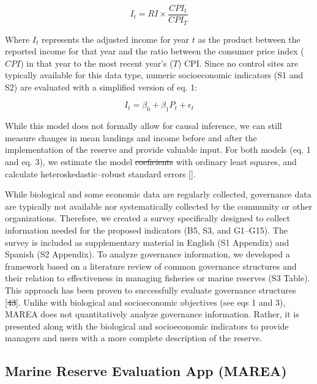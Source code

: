 \documentclass[12pt,]{article}
\providecommand{\DIFaddtex}[1]{{\protect\color{blue}\uwave{#1}}} %
\providecommand{\DIFdeltex}[1]{{\protect\color{red}\sout{#1}}}                      %
\providecommand{\DIFaddbegin}{} %
\providecommand{\DIFaddend}{} %
\providecommand{\DIFdelbegin}{} %
\providecommand{\DIFdelend}{} %
\providecommand{\DIFadd}[1]{\texorpdfstring{\DIFaddtex{#1}}{#1}} %
\providecommand{\DIFdel}[1]{\texorpdfstring{\DIFdeltex{#1}}{}} %
\newcommand{\DIFscaledelfig}{0.5}
\newlength{\DIFdelgraphicswidth} %
\newlength{\DIFdelgraphicsheight} %
\newcommand{\DIFaddincludegraphics}[2][]{{\color{blue}\fbox{\DIFOincludegraphics[#1]{#2}}}} %
\newcommand{\DIFdelincludegraphics}[2][]{%
\sbox{\DIFdelgraphicsbox}{\DIFOincludegraphics[#1]{#2}}%
\settoboxwidth{\DIFdelgraphicswidth}{\DIFdelgraphicsbox} %
\settoboxtotalheight{\DIFdelgraphicsheight}{\DIFdelgraphicsbox} %
\scalebox{\DIFscaledelfig}{%
\parbox[b]{\DIFdelgraphicswidth}{\usebox{\DIFdelgraphicsbox}\\[-\baselineskip] \rule{\DIFdelgraphicswidth}{0em}}\llap{\resizebox{\DIFdelgraphicswidth}{\DIFdelgraphicsheight}{%
\setlength{\unitlength}{\DIFdelgraphicswidth}%
\begin{picture}(1,1)%
\thicklines\linethickness{2pt} %
{\color[rgb]{1,0,0}\put(0,0){\framebox(1,1){}}}%
{\color[rgb]{1,0,0}\put(0,0){\line( 1,1){1}}}%
{\color[rgb]{1,0,0}\put(0,1){\line(1,-1){1}}}%
\end{picture}%
}\hspace*{3pt}}} %
} %
\DeclareRobustCommand{\DIFaddbegin}{\DIFOaddbegin \let\includegraphics\DIFaddincludegraphics} %
\DeclareRobustCommand{\DIFaddend}{\DIFOaddend \let\includegraphics\DIFOincludegraphics} %
\DeclareRobustCommand{\DIFdelbegin}{\DIFOdelbegin \let\includegraphics\DIFdelincludegraphics} %
\DeclareRobustCommand{\DIFdelend}{\DIFOaddend \let\includegraphics\DIFOincludegraphics} %
\begin{document}
\begin{equation}I_t = RI\times \frac{CPI_t}{CPI_T}\end{equation}

Where \(I_t\) represents the adjusted income for year \(t\) as the
product between the reported income for that year and the ratio between
the consumer price index (\(CPI\)) in that year to the most recent
year's (\(T\)) CPI. Since no control sites are typically available for
this data type, numeric socioeconomic indicators (S1 and S2) are
evaluated with a simplified version of eq. 1:

\begin{equation}I_{t}=\beta_0 + \beta_1P_{t} + \epsilon_{t}\end{equation}

While this model does not formally allow for causal inference, we can
still measure changes in mean landings and income before and after the
implementation of the reserve and provide valuable input. For both
models (eq. 1 and eq. 3), we estimate the model \DIFdelbegin \DIFdel{coeficients }\DIFdelend \DIFaddbegin \DIFadd{coefficients }\DIFaddend with
ordinary least squares, and calculate heteroskedastic--robust standard
errors \DIFaddbegin {[}\DIFadd{49}{]}\DIFaddend .

While biological and some economic data are regularly collected,
governance data are typically not available nor systematically collected
by the community or other organizations. Therefore, we created a survey
specifically designed to collect information needed for the proposed
indicators (B5, S3, and G1--G15). The survey is included as
supplementary material in English (S1 Appendix) and Spanish (S2
Appendix). To analyze governance information, we developed a framework
based on a literature review of common governance structures and their
relation to effectiveness in managing fisheries or marine reserves (S3
Table). This approach has been proven to successfully evaluate
governance structures {[}\DIFdelbegin \DIFdel{43}\DIFdelend \DIFaddbegin \DIFadd{50}\DIFaddend {]}. Unlike with biological and socioeconomic
objectives (see eqs 1 and 3), MAREA does not quantitatively analyze
governance information. Rather, it is presented along with the
biological and socioeconomic indicators to provide managers and users
with a more complete description of the reserve.

\subsection{Marine Reserve Evaluation App
(MAREA)}\label{marine-reserve-evaluation-app-marea}
\end{document}
